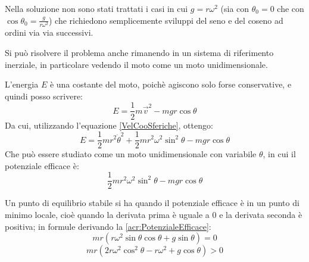 \documentclass[../main.tex]{subfiles}
\begin{document}
Nella soluzione non sono stati trattati i casi in cui $g=r\omega^2$ 
(sia con $\theta_0=0$ che con $\cos\theta_0=\frac{g}{r\omega^2}$) che richiedono semplicemente
sviluppi del seno e del coseno ad ordini via via successivi.


\solution[2]
Si può risolvere il problema anche rimanendo in un sistema di riferimento inerziale, in particolare vedendo
il moto come un moto unidimensionale.

L'energia $E$ è una costante del moto, poichè agiscono solo forse conservative, e quindi posso scrivere:
\begin{equation*}
	E=\frac{1}{2}m\overrightarrow{v}^2-mgr\cos\theta
\end{equation*}
Da cui, utilizzando l'equazione \cref{VelCooSferiche}, ottengo:
\begin{equation*}
	E=\frac{1}{2}mr^2\dot{\theta}^2+\frac{1}{2}mr^2\omega^2\sin^2\theta-mgr\cos\theta
\end{equation*}
Che può essere studiato come un moto unidimensionale con variabile $\theta$, in cui il potenziale
efficace è:
\begin{equation}\label{acr:PotenzialeEfficace}
	\frac{1}{2}mr^2\omega^2\sin^2\theta-mgr\cos\theta
\end{equation}

Un punto di equilibrio stabile si ha quando il potenziale efficace è in un punto di minimo locale, cioè
quando la derivata prima è uguale a 0 e la derivata seconda è positiva; in formule derivando la
\cref{acr:PotenzialeEfficace}:
\begin{equation}
	mr\left( r\omega^2\sin\theta\cos\theta+g\sin\theta \right)=0
\end{equation}
\begin{equation}
	mr\left( 2r\omega^2\cos^2\theta-r\omega^2+g\cos\theta \right)>0
\end{equation}
\end{document}
